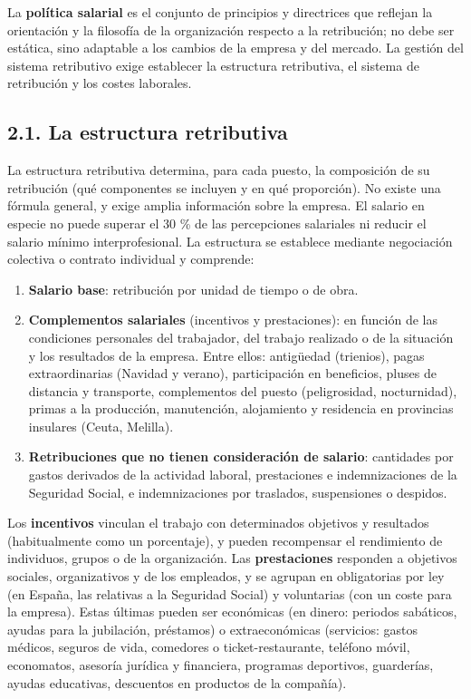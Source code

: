 \documentclass[12pt]{book} %
\providecommand{\tightlist}{%
  \setlength{\itemsep}{0pt}\setlength{\parskip}{0pt}}
\begin{document}
La \textbf{política salarial} es el conjunto de principios y directrices
que reflejan la orientación y la filosofía de la organización respecto a
la retribución; no debe ser estática, sino adaptable a los cambios de la
empresa y del mercado. La gestión del sistema retributivo exige
establecer la estructura retributiva, el sistema de retribución y los
costes laborales.

\hypertarget{la-estructura-retributiva}{%
\subsection{2.1. La estructura
retributiva}\label{la-estructura-retributiva}}

La estructura retributiva determina, para cada puesto, la composición de
su retribución (qué componentes se incluyen y en qué proporción). No
existe una fórmula general, y exige amplia información sobre la empresa.
El salario en especie no puede superar el 30 \% de las percepciones
salariales ni reducir el salario mínimo interprofesional. La estructura
se establece mediante negociación colectiva o contrato individual y
comprende:

\begin{enumerate}
\def\labelenumi{\arabic{enumi}.}
\tightlist
\item
  \textbf{Salario base}: retribución por unidad de tiempo o de obra.
\item
  \textbf{Complementos salariales} (incentivos y prestaciones): en
  función de las condiciones personales del trabajador, del trabajo
  realizado o de la situación y los resultados de la empresa. Entre
  ellos: antigüedad (trienios), pagas extraordinarias (Navidad y
  verano), participación en beneficios, pluses de distancia y
  transporte, complementos del puesto (peligrosidad, nocturnidad),
  primas a la producción, manutención, alojamiento y residencia en
  provincias insulares (Ceuta, Melilla).
\item
  \textbf{Retribuciones que no tienen consideración de salario}:
  cantidades por gastos derivados de la actividad laboral, prestaciones
  e indemnizaciones de la Seguridad Social, e indemnizaciones por
  traslados, suspensiones o despidos.
\end{enumerate}

Los \textbf{incentivos} vinculan el trabajo con determinados objetivos y
resultados (habitualmente como un porcentaje), y pueden recompensar el
rendimiento de individuos, grupos o de la organización. Las
\textbf{prestaciones} responden a objetivos sociales, organizativos y de
los empleados, y se agrupan en obligatorias por ley (en España, las
relativas a la Seguridad Social) y voluntarias (con un coste para la
empresa). Estas últimas pueden ser económicas (en dinero: periodos
sabáticos, ayudas para la jubilación, préstamos) o extraeconómicas
(servicios: gastos médicos, seguros de vida, comedores o
ticket-restaurante, teléfono móvil, economatos, asesoría jurídica y
financiera, programas deportivos, guarderías, ayudas educativas,
descuentos en productos de la compañía).
\end{document}
